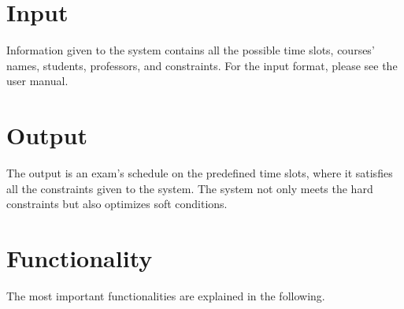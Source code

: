 \documentclass{report}
\begin{document}
\section{Input}
Information given to the system contains all the possible time slots, courses' names, students, professors, and constraints. For the input format, please see the user manual.
\section{Output}
The output is an exam's schedule on the predefined time slots, where it satisfies all the constraints given to the system. The system not only meets the hard constraints but also optimizes soft conditions. 
\section{Functionality}
The most important functionalities are explained in the following.
\end{document}
